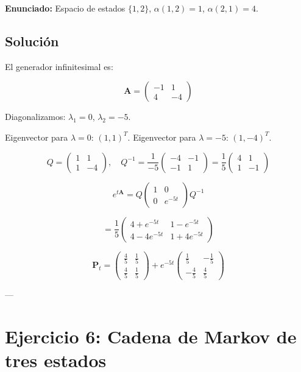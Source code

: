 \documentclass{article}
\theoremstyle{definition}
\newcommand{\A}{\mathbf{A}}
\newcommand{\PP}{\mathbf{P}}
\begin{document}
\textbf{Enunciado:} Espacio de estados $\{1,2\}$, $\alpha(1,2) = 1$, $\alpha(2,1) = 4$.

\subsection*{Solución}

El generador infinitesimal es:

\[
\A = \begin{pmatrix} -1 & 1 \\ 4 & -4 \end{pmatrix}
\]

Diagonalizamos: $\lambda_1 = 0$, $\lambda_2 = -5$.

Eigenvector para $\lambda = 0$: $(1,1)^T$.  
Eigenvector para $\lambda = -5$: $(1,-4)^T$.

\[
Q = \begin{pmatrix} 1 & 1 \\ 1 & -4 \end{pmatrix}, \quad Q^{-1} = \frac{1}{-5} \begin{pmatrix} -4 & -1 \\ -1 & 1 \end{pmatrix} = \frac{1}{5} \begin{pmatrix} 4 & 1 \\ 1 & -1 \end{pmatrix}
\]

\[
e^{t\A} = Q \begin{pmatrix} 1 & 0 \\ 0 & e^{-5t} \end{pmatrix} Q^{-1}
\]

\[
= \frac{1}{5} \begin{pmatrix} 4 + e^{-5t} & 1 - e^{-5t} \\ 4 - 4e^{-5t} & 1 + 4e^{-5t} \end{pmatrix}
\]

\[
\PP_t = \begin{pmatrix} \frac{4}{5} & \frac{1}{5} \\ \frac{4}{5} & \frac{1}{5} \end{pmatrix} + e^{-5t} \begin{pmatrix} \frac{1}{5} & -\frac{1}{5} \\ -\frac{4}{5} & \frac{4}{5} \end{pmatrix}
\]

---

\section*{Ejercicio 6: Cadena de Markov de tres estados}
\end{document}
